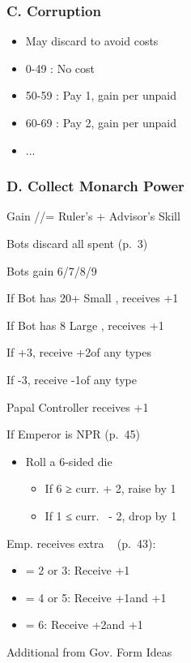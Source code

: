 \documentclass[10pt]{article}
\begin{document}
\subsubsection*{C. Corruption}
\begin{itemize}
	\item May discard \ducats to avoid costs
	\item 0-49 \ducats: No cost
	\item 50-59 \ducats: Pay 1\adminpower, gain \interest per unpaid \adminpower
	\item 60-69 \ducats: Pay 2\adminpower, gain \interest per unpaid \adminpower
	\item ...
\end{itemize}

\subsubsection*{D. Collect Monarch Power}
\begin{itemize}
	\item Gain \adminpower/\diplopower/\milpower = Ruler's + Advisor's Skill
	{\botrules
	\item Bots discard all spent \botpower (p.~3)
	\item Bots gain 6/7/8/9 \botpower
	\item If Bot has 20+ Small \towns, receives +1\botpower
	\item If Bot has 8 Large \towns, receives +1\botpower
	}
	\item If +3\stability, receive +2\monarchpower of any types
	\item If -3\stability, receive -1\monarchpower of any type
	\item Papal Controller receives +1\diplopower~
	\item If Emperor is NPR (p.~45) 
	\begin{itemize}
		\item Roll a 6-sided die
		\begin{itemize}
			\item If 6  ≥ curr. \authority + 2, raise \authority by 1
			\item If 1  ≤ curr. \authority~- 2, drop \authority by 1
		\end{itemize}
	\end{itemize}
	\item Emp. receives extra \monarchpower~ (p.~43):
	\begin{itemize}
		\item \authority = 2 or 3: Receive +1\diplopower
		\item \authority = 4 or 5: Receive +1\diplopower and +1\milpower
		\item \authority = 6: Receive +2\diplopower and +1\milpower
	\end{itemize}
  \item Additional \monarchpower from Gov. Form Ideas
\end{itemize}
\end{document}
